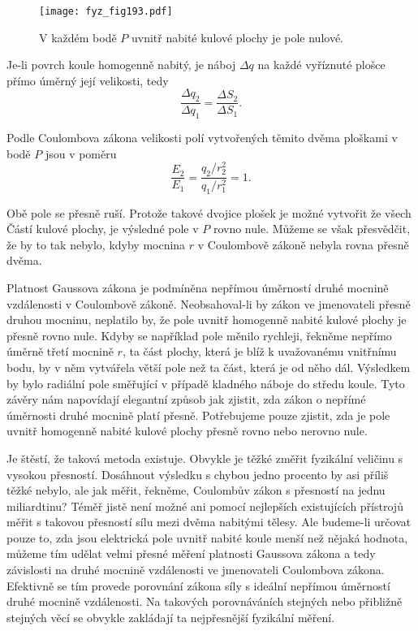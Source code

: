 {  \begin{figure}[ht!] %
    \centering
    \texttt{[image: fyz\_fig193.pdf]}
    \caption{V každém bodě \(P\) uvnitř nabité kulové plochy je pole nulové.}
    \label{fyz:fig193}
  \end{figure}
  Je-li povrch koule homogenně nabitý, je náboj \(\Delta q\) na každé vyříznuté plošce přímo 
  úměrný její velikosti, tedy \[\frac{\Delta q_2}{\Delta q_1} = \frac{\Delta S_2}{\Delta S_1}.\]
  
  Podle Coulombova zákona velikosti polí vytvořených těmito dvěma ploškami v bodě \(P\) jsou v 
  poměru \[\frac{E_2}{E_1} = \frac{q_2/r_2^2}{q_1/r_1^2} = 1.\]
  
  Obě pole se přesně ruší. Protože takové dvojice plošek je možné vytvořit že všech Částí 
  kulové plochy, je výsledné pole v \(P\) rovno nule. Můžeme se však přesvědčit, že by to tak 
  nebylo, kdyby mocnina \(r\) v Coulombově zákoně nebyla rovna přesně dvěma.
  
  Platnost Gaussova zákona je podmíněna nepřímou úměrností druhé mocnině vzdálenosti v 
  Coulombově zákoně. Neob\-sahoval-li by zákon ve jmenovateli přesně druhou mocninu, neplatilo 
  by, že pole uvnitř homogenně nabité kulové plochy je přesně rovno nule. Kdyby se například 
  pole měnilo rychleji, řekněme nepřímo úměrně třetí mocnině \(r\), ta část plochy, která je 
  blíž k uvažovanému vnitřnímu bodu, by v něm vytvářela větší pole než ta část, která je od 
  něho dál. Výsledkem by bylo radiální pole směřující v případě kladného náboje do středu 
  koule. Tyto závěry nám napovídají elegantní způsob jak zjistit, zda zákon o nepřímé úměrnosti 
  druhé mocnině platí přesně. Potřebujeme pouze zjistit, zda je pole uvnitř homogenně nabité 
  kulové plochy přesně rovno nebo nerovno nule.
  
  Je štěstí, že taková metoda existuje. Obvykle je těžké změřit fyzikální veličinu s vysokou 
  přesností. Dosáhnout výsledku s chybou jedno procento by asi příliš těžké nebylo, ale jak 
  měřit, řekněme, Coulombův zákon s přesností na jednu miliardtinu? Téměř jistě není možné ani 
  pomocí nejlepších existujících přístrojů měřit s takovou přesností sílu mezi dvěma nabitými 
  tělesy. Ale budeme-li určovat pouze to, zda jsou elektrická pole uvnitř nabité koule menší 
  než nějaká hodnota, můžeme tím udělat velmi přesné měření platnosti Gaussova zákona a tedy 
  závislosti na druhé mocnině vzdálenosti ve jmenovateli Coulombova zákona. Efektivně se tím 
  provede porovnání zákona síly s ideální nepřímou úměrností druhé mocnině vzdálenosti. Na 
  takových porovnáváních stejných nebo přibližně stejných věcí se obvykle zakládají ta 
  nejpřesnější fyzikální měření.
  
}
